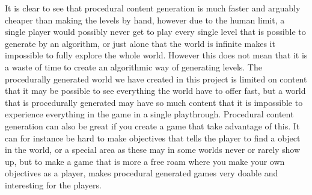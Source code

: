 It is clear to see that procedural content generation is much faster and arguably cheaper than making the levels by hand, however due to the human limit, a single player would possibly never get to play every single level that is possible to generate by an algorithm, or just alone that the world is infinite makes it impossible to fully explore the whole world. However this does not mean that it is a waste of time to create an algorithmic way of generating levels. The procedurally generated world we have created in this project is limited on content that it may be possible to see everything the world have to offer fast, but a world that is procedurally generated may have so much content that it is impossible to experience everything in the game in a single playthrough. Procedural content generation can also be great if you create a game that take advantage of this. It can for instance be hard to make objectives that tells the player to find a object in the world, or a special area as these may in some worlds never or rarely show up, but to make a game that is more a free roam where you make your own objectives as a player, makes procedural generated games very doable and interesting for the players.